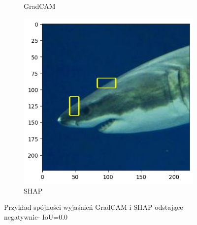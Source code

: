 \begin{figure}[h]
\begin{subfigure}[b]{0.3\textwidth}
		\caption{GradCAM}  \label{}
	\end{subfigure}
	\begin{subfigure}[b]{0.3\textwidth}
		\centering\includegraphics[width=.9\textwidth]{img/examples/appendix/n01484850_19435_shap}
		\caption{SHAP}
	\end{subfigure}
	\caption{Przykład spójności wyjaśnień GradCAM i SHAP  odstające negatywnie- IoU=0.0}
	\label{}
\end{figure}
